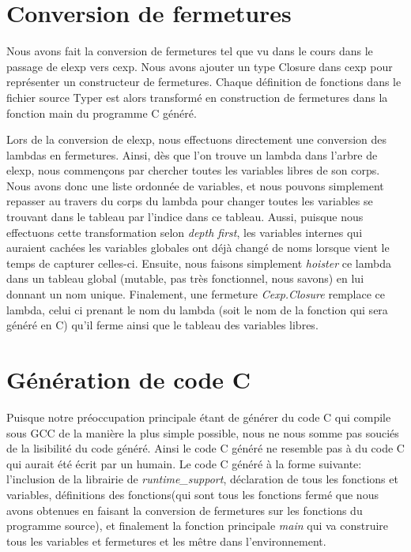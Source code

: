 \documentclass{article}
\begin{document}
\section{Conversion de fermetures}
Nous avons fait la conversion de fermetures tel que vu dans le cours dans le
passage de elexp vers cexp. Nous avons ajouter un type Closure dans cexp pour
représenter un constructeur de fermetures. Chaque définition de fonctions dans
le fichier source Typer est alors transformé en construction de fermetures
dans la fonction main du programme C généré.


Lors de la conversion de elexp, nous effectuons directement une conversion des
lambdas en fermetures. Ainsi, dès que l'on trouve un lambda dans l'arbre de
elexp, nous commençons par chercher toutes les variables libres de son corps.
\cite{closureconversion} Nous avons donc une liste ordonnée de variables, et
nous pouvons simplement repasser au travers du corps du lambda pour changer
toutes les variables se trouvant dans le tableau par l'indice dans ce tableau.
Aussi, puisque nous effectuons cette transformation selon \emph{depth first},
les variables internes qui auraient cachées les variables globales ont déjà
changé de noms lorsque vient le temps de capturer celles-ci. Ensuite, nous
faisons simplement \emph{hoister} ce lambda dans un tableau global (mutable,
pas très fonctionnel, nous savons) en lui donnant un nom unique. Finalement,
une fermeture \emph{Cexp.Closure} remplace ce lambda, celui ci prenant le nom
du lambda (soit le nom de la fonction qui sera généré en C) qu'il ferme ainsi
que le tableau des variables libres.

\section{Génération de code C}
Puisque notre préoccupation principale étant de générer du code C qui compile
sous GCC de la manière la plus simple possible, nous ne nous somme pas souciés
de la lisibilité du code généré. Ainsi le code C généré ne resemble pas à du
code C qui aurait été écrit par un humain. Le code C généré à la forme suivante:
l'inclusion de la librairie de \textit{runtime\_support}, déclaration de tous 
les fonctions et variables, définitions des fonctions(qui sont tous les
fonctions fermé que nous avons obtenues en faisant la conversion de fermetures
sur les fonctions du programme source),  et finalement la fonction principale
\textit{main} qui va construire tous les variables et fermetures et les mêtre
dans l'environnement.
\end{document}
